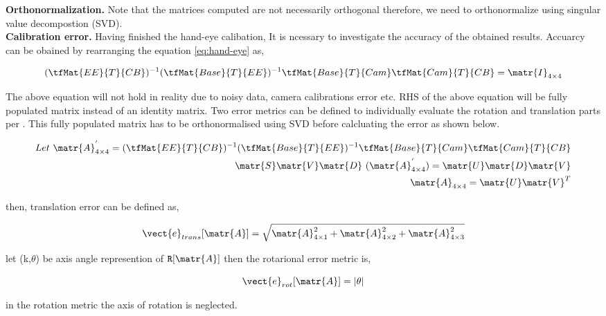 \textbf{Orthonormalization.} Note that the matrices computed are not necessarily orthogonal therefore, we need to orthonormalize using singular value decompostion (SVD).\\


\textbf{Calibration error.} Having finished the hand-eye calibation, It is ncessary to investigate the accuracy of the obtained results. Accuarcy can be obained by rearranging the equation \ref{eq:hand-eye} as,

\begin{equation*}
	(\tfMat{EE}{T}{CB})^{-1} (\tfMat{Base}{T}{EE})^{-1} \tfMat{Base}{T}{Cam} \tfMat{Cam}{T}{CB} = \matr{I}_{4\times4}
\end{equation*}

The above equation will not hold in reality due to noisy data, camera calibrations error etc. RHS of the above equation will be fully populated matrix instead of an identity matrix. Two error metrics can be defined to individually evaluate the rotation and translation parts per \cite{ernst}. This fully populated matrix has to be orthonormalised using SVD before calcluating the error as shown below. 

\begin{equation*}
	\centering
	\begin{split}
		Let\ \matr{A}_{4\times4}^{'} = (\tfMat{EE}{T}{CB})^{-1} (\tfMat{Base}{T}{EE})^{-1} \tfMat{Base}{T}{Cam} \tfMat{Cam}{T}{CB} \\
		\matr{S}\matr{V}\matr{D}\ (\matr{A}_{4\times4}^{'}) = \matr{U}\matr{D}\matr{V}\\ 
		\matr{A}_{4\times4} = \matr{U}\matr{V}^T
	\end{split}
\end{equation*} 

\noindent then, translation error can be defined as,

\begin{equation*}
	\vect{e}_{trans}[\matr{A}] = \sqrt{\matr{A}_{4\times1}^{2} + \matr{A}_{4\times2}^{2} + \matr{A}_{4\times3}^{2}}
\end{equation*} 

\noindent let (k,$\theta$) be axis angle represention \cite{axis-angle} of $\mathtt{R}[\matr{A}]$ then the rotarional error metric is,

\begin{equation*}
	\vect{e}_{rot}[\matr{A}] = |\theta|
\end{equation*} 

\noindent in the rotation metric the axis of rotation is neglected.